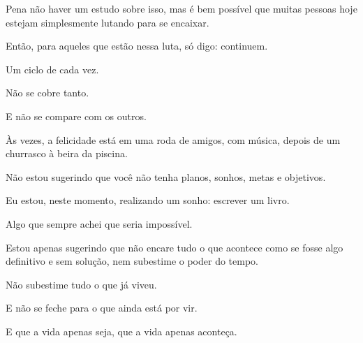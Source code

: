 Pena não haver um estudo sobre isso, mas é bem possível que muitas pessoas hoje estejam simplesmente lutando para se encaixar.

Então, para aqueles que estão nessa luta, só digo: continuem.

Um ciclo de cada vez.

Não se cobre tanto.

E não se compare com os outros.

Às vezes, a felicidade está em uma roda de amigos, com música, depois de um churrasco à beira da piscina.

Não estou sugerindo que você não tenha planos, sonhos, metas e objetivos.

Eu estou, neste momento, realizando um sonho: escrever um livro.

Algo que sempre achei que seria impossível.

Estou apenas sugerindo que não encare tudo o que acontece como se fosse algo definitivo e sem solução, nem subestime o poder do tempo.

Não subestime tudo o que já viveu.

E não se feche para o que ainda está por vir.

E que a vida apenas seja, que a vida apenas aconteça.